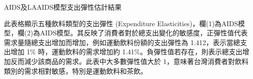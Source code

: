 %     

\begin{table}[H]
    \caption{AIDS及LAAIDS模型支出彈性估計結果} \label{exp}
    \center
    \footnotesize
    
\end{table}
\vspace{-2em}
\begin{singlespace}
    \begin{footnotesize}
        \raggedright
         此表格顯示五種飲料類型的支出彈性 (Expenditure Elasticities)，欄(1)為AIDS模型，欄(2)為AIDS模型。其反映了消費者對於總支出變化的敏感度，正彈性值代表需求量隨總支出增加而增加，例如運動飲料份額的支出彈性為 1.412，表示當總支出增加 1\% 時，運動飲料的需求增加約 1.41\%。負彈性值若存在，則表示總支出增加反而減少該商品的需求。此表中大多數彈性值大於 1，意味著台灣消費者對飲料類別的需求相對敏感，特別是運動飲料和茶飲。
    \end{footnotesize}
\end{singlespace}

